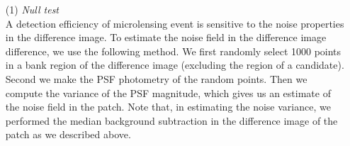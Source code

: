 \documentclass[iop, apj]{emulateapj}
\newcommand{\?}{\stackrel{?}{=}}
\begin{document}
\begin{itemize}
\item[(1)]{\it Null test}\\
\label{sec:nullt}
A detection efficiency of microlensing event is sensitive to the noise properties in the difference image. To estimate the noise field in the difference image difference, we use the following method. We first randomly select 1000 points in a bank region of the difference image (excluding the region of a candidate). Second we make the PSF photometry of the random points. Then we compute the variance of the PSF magnitude, which gives us an estimate of the noise field in the patch. Note that, in estimating the noise variance, we performed the median background subtraction in the difference image of the patch as we described above. 


\end{itemize}
\end{document}
